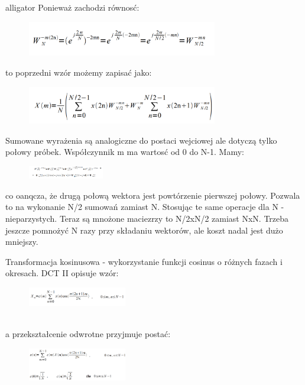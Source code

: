 \documentclass[12pt]{article}
\begin{document}
\begin{labeling}{alligator}
Ponieważ zachodzi równosć:
\begin{figure}[h!]
 \centering
 \includegraphics[width=8.3cm]{rownosc.PNG}
 \vspace{-0.3cm}
 \label{filtrS}
\end{figure}
to poprzedni wzór możemy zapisać jako:
\begin{figure}[h!]
 \centering
 \includegraphics[width=8.3cm]{FFTr.PNG}
 \vspace{-0.3cm}
 \label{filtrS}
\end{figure}

Sumowane wyrażenia są analogiczne do  postaci wejciowej ale dotyczą tylko połowy próbek. Współczynnik m ma wartosć od 0 do N-1.
Mamy:
\begin{figure}[h!]
 \centering
 \includegraphics[width=3.3cm]{mamy.PNG}
 \vspace{-0.3cm}
 \label{sp}
\end{figure}
co oanqcza, że drugą połową wektora jest powtórzenie pierwszej połowy. Pozwala to na wykonanie N/2 sumowań zamiast N. Stosując te same operacje dla N - nieparzystych. Teraz są mnożone maciezrzy to N/2xN/2 zamiast NxN. Trzeba jeszcze pomnożyć N razy przy składaniu wektorów, ale koszt nadal jest dużo mniejszy.


\item [Transformacja kosinusowa] - wykorzystanie funkcji cosinus o różnych fazach i okresach. DCT II opisuje wzór:
\begin{figure}[h!]
 \centering
 \includegraphics[width=4.3cm]{DCT2.PNG}
 \vspace{-0.3cm}
 \label{kr}
\end{figure}
\\ a przekształcenie odwrotne przyjmuje postać: 
\begin{figure}[h!]
 \centering
 \includegraphics[width=4.3cm]{DCT2O.PNG}
 \vspace{-0.3cm}
 \label{kw}
\end{figure}


\end{labeling}
\end{document}
